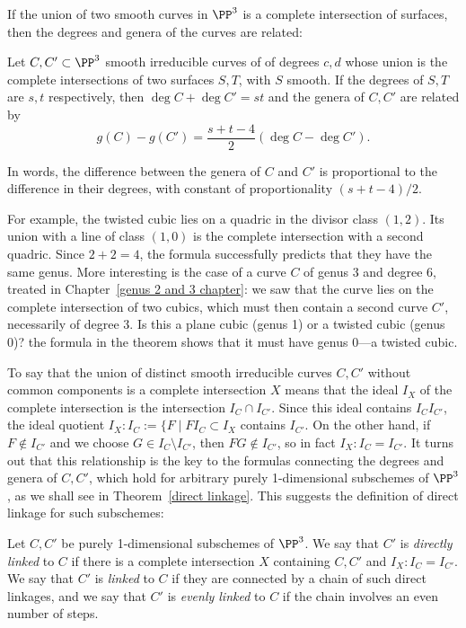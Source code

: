If the union of two smooth curves in $\PP^3$ is a complete intersection of surfaces, then the degrees and genera
of the curves are related:

\begin{theorem}\label{liaison genus formula-first version} Let $C, {C'}\subset \PP^3$ smooth irreducible curves of  of degrees $c,d$ whose union is the complete intersections of two surfaces $S,T$, with $S$ smooth. If the degrees of $S,T$ are $s,t$ respectively, then $\deg C+\deg C' = st$ and the genera of $C,C'$ are
related by
 $$
 g(C) - g({C'}) = \frac{s+t-4}{2}(\deg C-\deg {C'}).
 $$
\end{theorem}
In words, the difference between the genera of $C$ and ${C'}$ is proportional to the difference in their degrees, with constant of proportionality $(s+t-4)/2$.

For example, the twisted cubic lies on a quadric in the divisor class $(1,2)$. Its union with a line of class $(1,0)$ is the complete intersection with
a second quadric. Since $2+2=4$, the formula successfully predicts that they have the same genus. More interesting is the case of
a curve $C$ of genus 3 and degree 6, treated in Chapter~\ref{genus 2 and 3 chapter}: we saw that the curve lies on the complete intersection of
two cubics, which must then contain a second curve $C'$, necessarily of degree $3$. Is this a plane cubic (genus 1) or a twisted cubic (genus 0)?
the formula in the theorem shows that it must have genus 0---a twisted cubic.

To say that the union of distinct smooth irreducible curves $C, C'$ without common components is a complete intersection $X$ means that 
the ideal $I_X$ of the complete intersection is the intersection $I_C\cap I_{C'}$. Since this ideal contains $I_CI_{C'}$, the ideal quotient
$I_X:I_C:= \{F \mid FI_C\subset I_X$
contains $I_{C'}$. On the other hand, if $F \notin I_{C'}$ and we choose $G\in I_C\setminus I_{C'}$, then $FG\notin I_{C'}$, so in fact
$I_X:I_C = I_{C'}$. It turns out that this relationship is the key to the formulas connecting the degrees and genera of $C,C'$, which hold 
for arbitrary purely 1-dimensional subschemes of $\PP^3$, as we shall see in Theorem~\ref{direct linkage}. This suggests the definition
of direct linkage for such subschemes:

\begin{definition}
Let $C,C'$ be purely 1-dimensional subschemes of $\PP^3$. We say that $C'$ is \emph{directly linked} to $C$ if there is a complete
intersection $X$ containing $C,C'$ and $I_X:I_C = I_{C'}$. We say that $C'$ is \emph{linked} to $C$ if they are connected by a chain of such
direct linkages, and we say that $C'$ is \emph{evenly linked} to $C$ if the chain involves an even number of steps.
\end{definition}

